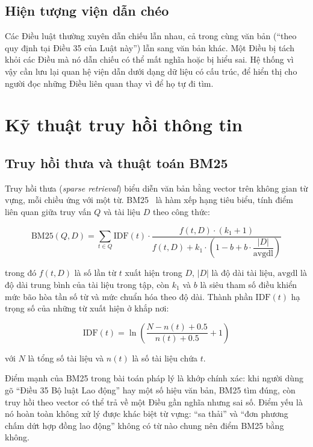 \documentclass[12pt,a4paper]{report}
\numberwithin{equation}{chapter}
\numberwithin{figure}{chapter}
\numberwithin{table}{chapter}
\begin{document}
\subsection{Hiện tượng viện dẫn chéo}
Các Điều luật thường xuyên dẫn chiếu lẫn nhau, cả trong cùng văn bản (``theo quy
định tại Điều 35 của Luật này'') lẫn sang văn bản khác. Một Điều bị tách khỏi các
Điều mà nó dẫn chiếu có thể mất nghĩa hoặc bị hiểu sai. Hệ thống vì vậy cần lưu
lại quan hệ viện dẫn dưới dạng dữ liệu có cấu trúc, để hiển thị cho người đọc
những Điều liên quan thay vì để họ tự đi tìm.

\section{Kỹ thuật truy hồi thông tin}

\subsection{Truy hồi thưa và thuật toán BM25}
Truy hồi thưa (\textit{sparse retrieval}) biểu diễn văn bản bằng vector trên không
gian từ vựng, mỗi chiều ứng với một từ. BM25~\cite{robertson2009bm25} là hàm xếp
hạng tiêu biểu, tính điểm liên quan giữa truy vấn $Q$ và tài liệu $D$ theo công
thức:

\begin{equation}
\label{eq:bm25}
\mathrm{BM25}(Q, D) = \sum_{t \in Q} \mathrm{IDF}(t) \cdot
\frac{f(t, D) \cdot (k_1 + 1)}
     {f(t, D) + k_1 \cdot \left(1 - b + b \cdot \dfrac{|D|}{\mathrm{avgdl}}\right)}
\end{equation}

trong đó $f(t, D)$ là số lần từ $t$ xuất hiện trong $D$, $|D|$ là độ dài tài
liệu, $\mathrm{avgdl}$ là độ dài trung bình của tài liệu trong tập, còn $k_1$ và
$b$ là siêu tham số điều khiển mức bão hòa tần số từ và mức chuẩn hóa theo độ
dài. Thành phần $\mathrm{IDF}(t)$ hạ trọng số của những từ xuất hiện ở khắp nơi:

\begin{equation}
\label{eq:idf}
\mathrm{IDF}(t) = \ln\left(\frac{N - n(t) + 0.5}{n(t) + 0.5} + 1\right)
\end{equation}

với $N$ là tổng số tài liệu và $n(t)$ là số tài liệu chứa $t$.

Điểm mạnh của BM25 trong bài toán pháp lý là khớp chính xác: khi người dùng gõ
``Điều 35 Bộ luật Lao động'' hay một số hiệu văn bản, BM25 tìm đúng, còn truy hồi
theo vector có thể trả về một Điều gần nghĩa nhưng sai số. Điểm yếu là nó hoàn
toàn không xử lý được khác biệt từ vựng: ``sa thải'' và ``đơn phương chấm dứt hợp
đồng lao động'' không có từ nào chung nên điểm BM25 bằng không.
\end{document}
